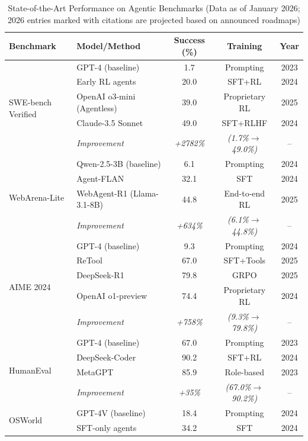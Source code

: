 \documentclass[12pt,a4paper]{report}
\theoremstyle{definition}
\begin{document}
\begin{table}[h]
\centering
\caption{State-of-the-Art Performance on Agentic Benchmarks (Data as of January 2026; 2026 entries marked with citations are projected based on announced roadmaps)}
\label{tab:sota_benchmarks}
\small
\begin{tabular}{@{}llccc@{}}
\toprule
\textbf{Benchmark} & \textbf{Model/Method} & \textbf{Success (\%)} & \textbf{Training} & \textbf{Year} \\
\midrule
\multirow{5}{*}{SWE-bench Verified}
& GPT-4 (baseline) & 1.7 & Prompting & 2023 \\
& Early RL agents & 20.0 & SFT+RL & 2024 \\
& OpenAI o3-mini (Agentless) & 39.0 & Proprietary RL & 2025 \\
& Claude-3.5 Sonnet & 49.0 & SFT+RLHF & 2024 \\
& \textit{Improvement} & \textit{+2782\%} & \textit{(1.7\%$\rightarrow$49.0\%)} & -- \\
\midrule
\multirow{4}{*}{WebArena-Lite}
& Qwen-2.5-3B (baseline) & 6.1 & Prompting & 2024 \\
& Agent-FLAN & 32.1 & SFT & 2024 \\
& WebAgent-R1 (Llama-3.1-8B) & 44.8 & End-to-end RL & 2025 \\
& \textit{Improvement} & \textit{+634\%} & \textit{(6.1\%$\rightarrow$44.8\%)} & -- \\
\midrule
\multirow{5}{*}{AIME 2024}
& GPT-4 (baseline) & 9.3 & Prompting & 2024 \\
& ReTool~\cite{feng2025retool} & 67.0 & SFT+Tools & 2025 \\
& DeepSeek-R1~\cite{deepseek2025r1} & 79.8 & GRPO & 2025 \\
& OpenAI o1-preview & 74.4 & Proprietary RL & 2024 \\
& \textit{Improvement} & \textit{+758\%} & \textit{(9.3\%$\rightarrow$79.8\%)} & -- \\
\midrule
\multirow{4}{*}{HumanEval}
& GPT-4 (baseline) & 67.0 & Prompting & 2023 \\
& DeepSeek-Coder & 90.2 & SFT+RL & 2024 \\
& MetaGPT~\cite{hong2023metagpt} & 85.9 & Role-based & 2023 \\
& \textit{Improvement} & \textit{+35\%} & \textit{(67.0\%$\rightarrow$90.2\%)} & -- \\
\midrule
\multirow{5}{*}{OSWorld}
& GPT-4V (baseline) & 18.4 & Prompting & 2024 \\
& SFT-only agents & 34.2 & SFT & 2024 \\

\end{tabular}
\end{table}
\end{document}
